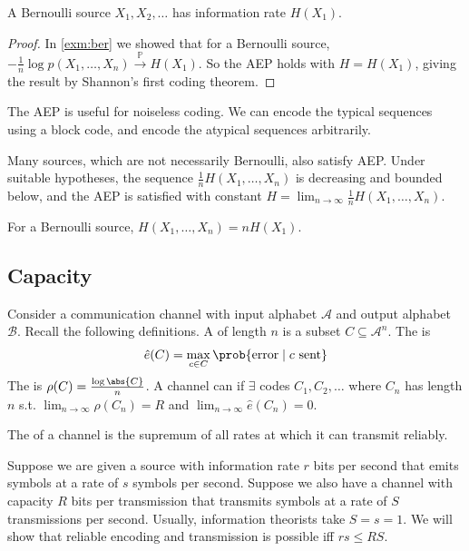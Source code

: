 \begin{corollary}
    A Bernoulli source $X_1, X_2, \dots$ has information rate $H(X_1)$.
\end{corollary}

\begin{proof}
    In \cref{exm:ber} we showed that for a Bernoulli source, \\ $-\frac{1}{n} \log p(X_1, \dots, X_n) \xrightarrow{\mathbb P} H(X_1)$.
    So the AEP holds with $H = H(X_1)$, giving the result by Shannon's first coding theorem.
\end{proof}

\begin{remark}
    The AEP is useful for noiseless coding.
    We can encode the typical sequences using a block code, and encode the atypical sequences arbitrarily.

    Many sources, which are not necessarily Bernoulli, also satisfy AEP.
    Under suitable hypotheses, the sequence $\frac{1}{n} H(X_1, \dots, X_n)$ is decreasing and bounded below, and the AEP is satisfied with constant $H = \lim_{n \to \infty} \frac{1}{n} H(X_1, \dots, X_n)$.

    For a Bernoulli source, $H(X_1, \dots, X_n) = n H(X_1)$.
\end{remark}

\subsection{Capacity}
Consider a communication channel with input alphabet $\mathcal A$ and output alphabet $\mathcal B$.
Recall the following definitions.
A  of length $n$ is a subset $C \subseteq \mathcal A^n$.
The  is
\begin{align*}
        \hat e(C) = \max_{c \in C} \prob{\text{error} \mid c \text{ sent}}
    \end{align*}
The  is $\rho(C) = \frac{\log \abs{C}}{n}$.
A channel can  if $\exists$ codes $C_1, C_2, \dots$ where $C_n$ has length $n$ s.t. $\lim_{n \to \infty} \rho(C_n) = R$ and $\lim_{n \to \infty} \hat e(C_n) = 0$.

\begin{definition}
    The  of a channel is the supremum of all rates at which it can transmit reliably.
\end{definition}

Suppose we are given a source with information rate $r$ bits per second that emits symbols at a rate of $s$ symbols per second.
Suppose we also have a channel with capacity $R$ bits per transmission that transmits symbols at a rate of $S$ transmissions per second.
Usually, information theorists take $S = s = 1$.
We will show that reliable encoding and transmission is possible iff $rs \leq RS$.

